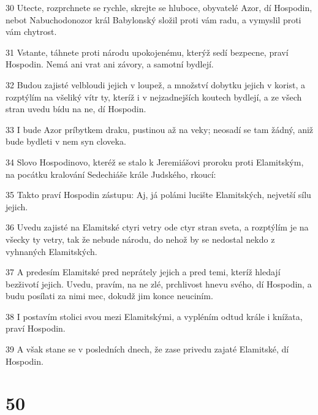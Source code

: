 \par 30 Utecte, rozprchnete se rychle, skrejte se hluboce, obyvatelé Azor, dí Hospodin, nebot Nabuchodonozor král Babylonský složil proti vám radu, a vymyslil proti vám chytrost.
\par 31 Vstante, táhnete proti národu upokojenému, kterýž sedí bezpecne, praví Hospodin. Nemá ani vrat ani závory, a samotní bydlejí.
\par 32 Budou zajisté velbloudi jejich v loupež, a množství dobytku jejich v korist, a rozptýlím na všeliký vítr ty, kteríž i v nejzadnejších koutech bydlejí, a ze všech stran uvedu bídu na ne, dí Hospodin.
\par 33 I bude Azor príbytkem draku, pustinou až na veky; neosadí se tam žádný, aniž bude bydleti v nem syn cloveka.
\par 34 Slovo Hospodinovo, kteréž se stalo k Jeremiášovi proroku proti Elamitským, na pocátku kralování Sedechiáše krále Judského, rkoucí:
\par 35 Takto praví Hospodin zástupu: Aj, já polámi lucište Elamitských, nejvetší sílu jejich.
\par 36 Uvedu zajisté na Elamitské ctyri vetry ode ctyr stran sveta, a rozptýlím je na všecky ty vetry, tak že nebude národu, do nehož by se nedostal nekdo z vyhnaných Elamitských.
\par 37 A predesím Elamitské pred neprátely jejich a pred temi, kteríž hledají bezživotí jejich. Uvedu, pravím, na ne zlé, prchlivost hnevu svého, dí Hospodin, a budu posílati za nimi mec, dokudž jim konce neuciním.
\par 38 I postavím stolici svou mezi Elamitskými, a vypléním odtud krále i knížata, praví Hospodin.
\par 39 A však stane se v posledních dnech, že zase privedu zajaté Elamitské, dí Hospodin.

\chapter{50}

